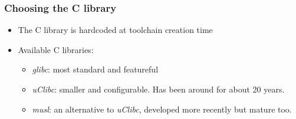 \begin{frame}
\frametitle{Choosing the C library}
\begin{itemize}
  \item The C library is hardcoded at toolchain creation time
  \item Available C libraries:
  \begin{itemize}
    \item {\em glibc}: most standard and featureful
    \item {\em uClibc}: smaller and configurable. Has been around for
        about 20 years.
    \item {\em musl}: an alternative to {\em uClibc}, developed more
        recently but mature too.
  \end{itemize}
\end{itemize}
\end{frame}

